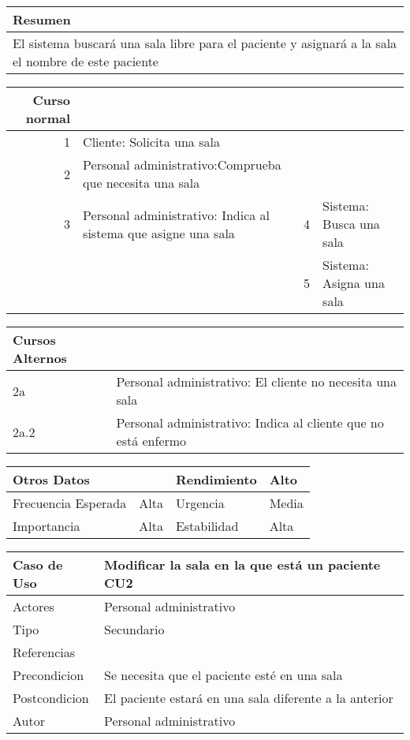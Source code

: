 \documentclass[10pt,a4paper,spanish]{report}
\begin{document}
\begin{center}
\begin{tabular}{l}
\hline
Resumen\\
\hline
El sistema buscará una sala libre para el paciente y asignará a la sala el nombre de este paciente\\
\hline
\end{tabular}
\end{center}

\begin{center}
\begin{tabular}{rlll}
\hline
Curso normal &  &  & \\
\hline
1 & Cliente: Solicita una sala &  & \\
\hline
2 & Personal administrativo:Comprueba que necesita una sala &  & \\
\hline
3 & Personal administrativo: Indica al sistema que asigne una sala & 4 & Sistema: Busca una sala\\
\hline
 &  & 5 & Sistema: Asigna una sala\\
\hline
\end{tabular}
\end{center}


\begin{center}
\begin{tabular}{ll}
\hline
Cursos Alternos & \\
\hline
2a & Personal administrativo: El cliente no necesita una sala\\
\hline
2a.2 & Personal administrativo: Indica al cliente que no está enfermo\\
\hline
\end{tabular}
\end{center}

\begin{center}
\begin{tabular}{llll}
\hline
Otros Datos &  & Rendimiento & Alto\\
\hline
Frecuencia Esperada & Alta & Urgencia & Media\\
\hline
Importancia & Alta & Estabilidad & Alta\\
\hline
\end{tabular}
\end{center}





\begin{center}
\begin{tabular}{ll}
\hline
Caso de Uso & Modificar la sala en la que está un paciente                 \vline CU2\\
\hline
Actores & Personal administrativo\\
\hline
Tipo & Secundario\\
\hline
Referencias & \\
\hline
Precondicion & Se necesita que el paciente esté en una sala\\
\hline
Postcondicion & El paciente estará en una sala diferente a la anterior\\
\hline
Autor & Personal administrativo\\
\hline
\end{tabular}
\end{center}
\end{document}
